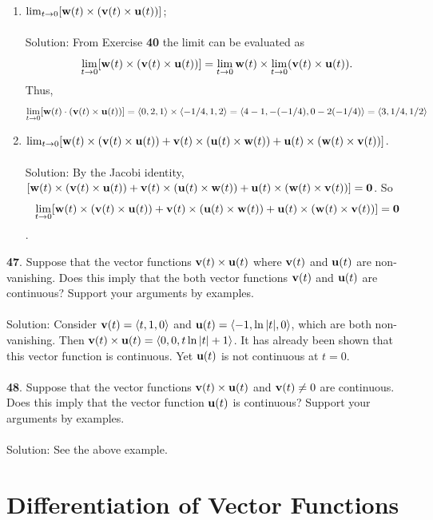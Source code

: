 \documentclass[12pt]{amsbook}
\newcommand{\la}{\langle}
\newcommand{\ra}{\rangle}
\begin{document}
\begin{enumerate}
  \item[{\small\bf 46}.] $\lim_{t\rightarrow 0}[{\bf w}(t)\times({\bf v}(t)\times{\bf u}(t))]$;
  \\
  \\
  {\sc Solution}: From Exercise {\bf 40} the limit can be evaluated as 
$$\lim_{t\rightarrow 0}[{\bf w}(t)\times({\bf v}(t)\times{\bf u}(t))]=\lim_{t\rightarrow 0}{\bf w}(t)\times\lim_{t\rightarrow 0}({\bf v}(t)\times{\bf u}(t)).$$  
Thus,
 $$\lim_{t\rightarrow 0}[{\bf w}(t)\cdot({\bf v}(t)\times{\bf u}(t))]=\la 0,2,1 \ra \times \la -1/4,1,2 \ra = \la 4-1, -(-1/4), 0-2(-1/4)\ra = \la 3,1/4,1/2 \ra$$
  \item[{\small\bf 47}.] $\lim_{t\rightarrow 0}[{\bf w}(t)\times({\bf v}(t)\times{\bf u}(t))+{\bf v}(t)\times({\bf u}(t)\times{\bf w}(t))+{\bf u}(t)\times({\bf w}(t)\times{\bf v}(t))]$.
  \\
  \\
  {\sc Solution}: By the Jacobi identity, $[{\bf w}(t)\times({\bf v}(t)\times{\bf u}(t))+{\bf v}(t)\times({\bf u}(t)\times{\bf w}(t))+{\bf u}(t)\times({\bf w}(t)\times{\bf v}(t))]=\bf 0$. So 
  $$\lim_{t\rightarrow 0}[{\bf w}(t)\times({\bf v}(t)\times{\bf u}(t))+{\bf v}(t)\times({\bf u}(t)\times{\bf w}(t))+{\bf u}(t)\times({\bf w}(t)\times{\bf v}(t))]=\bf {0}$$. 
\end{enumerate}
{\small\bf 47}. Suppose that the vector functions ${\bf v}(t)\times{\bf u}(t)$ where ${\bf v}(t)$ and ${\bf u}(t)$ are non-vanishing. Does this imply that the both vector functions ${\bf v}(t)$ and ${\bf u}(t)$ are continuous? Support your arguments by examples.
\\
\\
{\sc Solution}:  Consider ${\bf v}(t)=\la t,1,0 \ra$ and ${\bf u}(t)=\la -1,\ln|t|, 0 \ra$, which are both non-vanishing. Then ${\bf v}(t)\times{\bf u}(t)=\la 0,0,t\ln|t|+1\ra$. It has already been shown that this vector function is continuous. Yet ${\bf u}(t)$ is not continuous at $t=0$.
\\
\\
{\small\bf 48}. Suppose that the vector functions ${\bf v}(t)\times{\bf u}(t)$ and ${\bf v}(t) \neq 0$ are continuous. Does this imply that the vector function ${\bf u}(t)$ is continuous? Support
your arguments by examples.
\\
\\
{\sc Solution}: See the above example.

\newpage
\section{Differentiation of Vector Functions}
\end{document}
